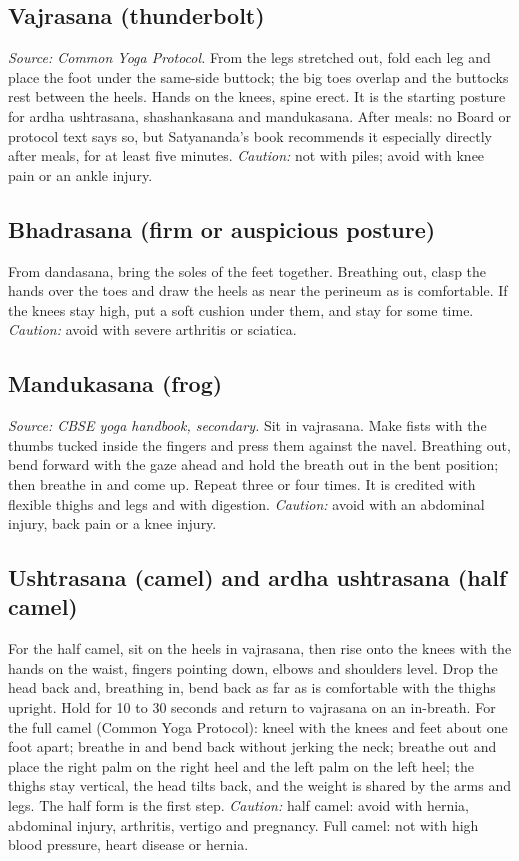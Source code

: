 \subsection*{Vajrasana (thunderbolt)}
\textit{Source: Common Yoga Protocol.} From the legs stretched out, fold each leg and place the foot under the same-side buttock; the big toes overlap and the buttocks rest between the heels. Hands on the knees, spine erect. It is the starting posture for ardha ushtrasana, shashankasana and mandukasana. After meals: no Board or protocol text says so, but Satyananda's book recommends it especially directly after meals, for at least five minutes.
\textit{Caution:} not with piles; avoid with knee pain or an ankle injury.

\subsection*{Bhadrasana (firm or auspicious posture)}
From dandasana, bring the soles of the feet together. Breathing out, clasp the hands over the toes and draw the heels as near the perineum as is comfortable. If the knees stay high, put a soft cushion under them, and stay for some time.
\textit{Caution:} avoid with severe arthritis or sciatica.

\subsection*{Mandukasana (frog)}
\textit{Source: CBSE yoga handbook, secondary.} Sit in vajrasana. Make fists with the thumbs tucked inside the fingers and press them against the navel. Breathing out, bend forward with the gaze ahead and hold the breath out in the bent position; then breathe in and come up. Repeat three or four times. It is credited with flexible thighs and legs and with digestion.
\textit{Caution:} avoid with an abdominal injury, back pain or a knee injury.

\subsection*{Ushtrasana (camel) and ardha ushtrasana (half camel)}
For the half camel, sit on the heels in vajrasana, then rise onto the knees with the hands on the waist, fingers pointing down, elbows and shoulders level. Drop the head back and, breathing in, bend back as far as is comfortable with the thighs upright. Hold for 10 to 30 seconds and return to vajrasana on an in-breath. For the full camel (Common Yoga Protocol): kneel with the knees and feet about one foot apart; breathe in and bend back without jerking the neck; breathe out and place the right palm on the right heel and the left palm on the left heel; the thighs stay vertical, the head tilts back, and the weight is shared by the arms and legs. The half form is the first step.
\textit{Caution:} half camel: avoid with hernia, abdominal injury, arthritis, vertigo and pregnancy. Full camel: not with high blood pressure, heart disease or hernia.

